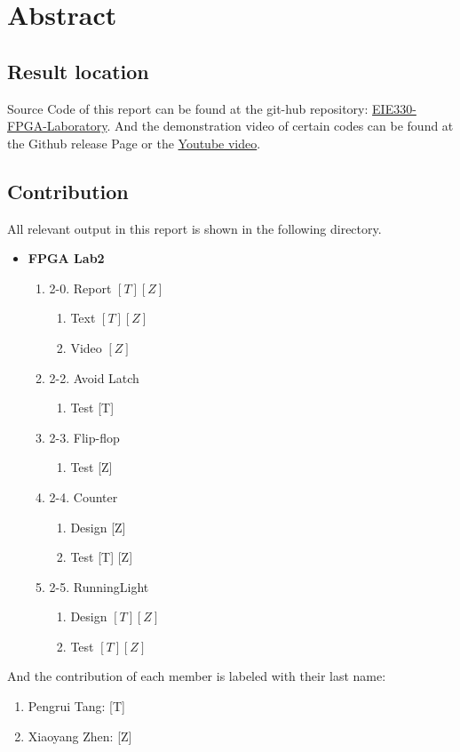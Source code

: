 \section{Abstract}
\subsection{Result location}
    Source Code of this report can be found at the git-hub repository: 
    \href{https://github.com/ZeppelinSCB/EIE330-FPGA-LAB-Report}
        {EIE330-FPGA-Laboratory}.
    And the demonstration video of certain codes can be found at the 
        {Github release Page} or the 
    \href{https://youtu.be/j1b7UCYvNyY}
        {Youtube video}.\par
\subsection{Contribution}
    All relevant output in this report is shown in the following directory.
    \begin{itemize}
    \item \textbf{FPGA Lab2}
        \begin{enumerate}
        \item 2-0. Report $[T][Z]$
            \begin{enumerate}
            \item Text $[T][Z]$
            \item Video $[Z]$
            \end{enumerate}
        \item 2-2. Avoid Latch
            \begin{enumerate}
            \item Test [T]
            \end{enumerate}
        \item 2-3. Flip-flop
            \begin{enumerate}
            \item Test [Z]
            \end{enumerate}
        \item 2-4. Counter
            \begin{enumerate}
            \item Design [Z]
            \item Test [T] [Z]
            \end{enumerate}
        \item 2-5. RunningLight
            \begin{enumerate}
            \item Design $[T][Z]$
            \item Test $[T][Z]$
            \end{enumerate}
        \end{enumerate}
    \end{itemize}

    And the contribution of each member is labeled with their last name:
    \begin{enumerate}[]
        \item Pengrui Tang: [T]
        \item Xiaoyang Zhen: [Z]
    \end{enumerate}